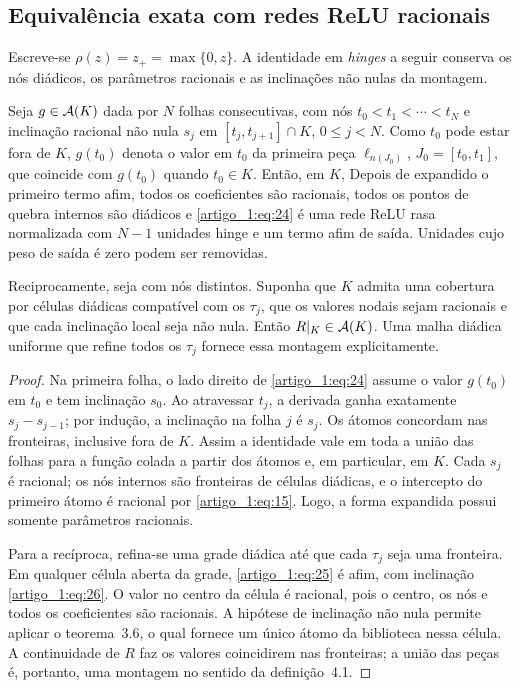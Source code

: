 \subsection{Equivalência exata com redes ReLU racionais}
Escreve-se $\rho(z)=z_+=\max\{0,z\}$. A identidade em \emph{hinges} a seguir conserva os nós diádicos, os parâmetros racionais e as inclinações não nulas da montagem.
\begin{teorema}\label{map:artigo_1:4.3}
Seja $g\in\mathcal A(K)$ dada por $N$ folhas consecutivas, com nós $t_0<t_1<\cdots<t_N$ e inclinação racional não nula $s_j$ em $[t_j,t_{j+1}]\cap K$, $0\le j<N$. Como $t_0$ pode estar fora de $K$, $g(t_0)$ denota o valor em $t_0$ da primeira peça $\ell_{n(J_0)}$, $J_0=[t_0,t_1]$, que coincide com $g(t_0)$ quando $t_0\in K$. Então, em $K$,
Depois de expandido o primeiro termo afim, todos os coeficientes são racionais, todos os pontos de quebra internos são diádicos e \eqref{artigo_1:eq:24} é uma rede ReLU rasa normalizada com $N-1$ unidades hinge e um termo afim de saída. Unidades cujo peso de saída é zero podem ser removidas.

Reciprocamente, seja
com nós distintos. Suponha que $K$ admita uma cobertura por células diádicas compatível com os $\tau_j$, que os valores nodais sejam racionais e que cada inclinação local
seja não nula. Então $R|_K\in\mathcal A(K)$. Uma malha diádica uniforme que refine todos os $\tau_j$ fornece essa montagem explicitamente.
\end{teorema}
\begin{proof}
Na primeira folha, o lado direito de \eqref{artigo_1:eq:24} assume o valor $g(t_0)$ em $t_0$ e tem inclinação $s_0$. Ao atravessar $t_j$, a derivada ganha exatamente $s_j-s_{j-1}$; por indução, a inclinação na folha $j$ é $s_j$. Os átomos concordam nas fronteiras, inclusive fora de $K$. Assim a identidade vale
em toda a união das folhas para a função colada a partir dos átomos e, em particular, em $K$. Cada $s_j$ é racional; os nós internos são fronteiras de células diádicas, e o intercepto do primeiro átomo é racional por \eqref{artigo_1:eq:15}. Logo, a forma expandida possui somente parâmetros racionais.

Para a recíproca, refina-se uma grade diádica até que cada $\tau_j$ seja uma fronteira. Em qualquer célula aberta da grade, \eqref{artigo_1:eq:25} é afim, com inclinação \eqref{artigo_1:eq:26}. O valor no centro da célula é racional, pois o centro, os nós e todos os coeficientes são racionais. A hipótese de inclinação não nula permite aplicar o teorema~3.6, o qual fornece um único átomo da biblioteca nessa célula. A continuidade de $R$ faz os valores coincidirem nas fronteiras; a união das peças é, portanto, uma montagem no sentido da definição~4.1.
\end{proof}
